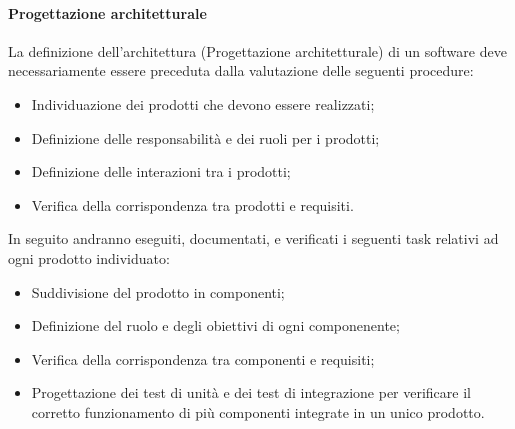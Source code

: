 			\paragraph*{Progettazione architetturale}
			La definizione dell'architettura (Progettazione architetturale) di un software deve 
			necessariamente essere preceduta dalla valutazione delle seguenti procedure:
                        \begin{itemize}
                                \item Individuazione dei prodotti che devono essere realizzati;
                                \item Definizione delle responsabilità e dei ruoli per i prodotti;
                                \item Definizione delle interazioni tra i prodotti;
                                \item Verifica della corrispondenza tra prodotti e requisiti.
                        \end{itemize}
                        In seguito andranno eseguiti, documentati, e verificati i seguenti task relativi ad ogni prodotto individuato:
                        \begin{itemize}
                                \item Suddivisione del prodotto in componenti;
                                \item Definizione del ruolo e degli obiettivi di ogni componenente;
                                \item Verifica della corrispondenza tra componenti e requisiti;
                                \item Progettazione dei test di unità e dei test di integrazione per verificare il corretto funzionamento di
                                      più componenti integrate in un unico prodotto.
                        \end{itemize}
			
